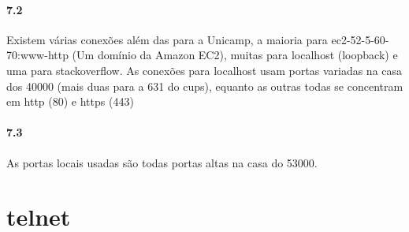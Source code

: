 \documentclass{article}
\begin{document}
\paragraph{7.2} Existem várias conexões além das para a Unicamp, a maioria para ec2-52-5-60-70:www-http
(Um domínio da Amazon EC2), muitas para localhost (loopback) e uma para stackoverflow. As conexões para
localhost usam portas variadas na casa dos 40000 (mais duas para a 631 do cups), equanto as outras
todas se concentram em http (80) e https (443)
\paragraph{7.3} As portas locais usadas são todas portas altas na casa do 53000.

\section*{telnet}
\end{document}
